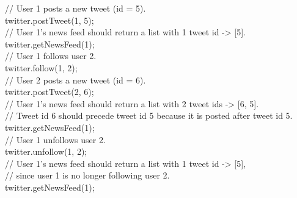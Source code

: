 // User 1 posts a new tweet (id = 5).\\
twitter.postTweet(1, 5);\\

// User 1's news feed should return a list with 1 tweet id -> [5].\\
twitter.getNewsFeed(1);\\

// User 1 follows user 2.\\
twitter.follow(1, 2);\\

// User 2 posts a new tweet (id = 6).\\
twitter.postTweet(2, 6);\\

// User 1's news feed should return a list with 2 tweet ids -> [6, 5].\\
// Tweet id 6 should precede tweet id 5 because it is posted after tweet id 5.\\
twitter.getNewsFeed(1);\\

// User 1 unfollows user 2.\\
twitter.unfollow(1, 2);\\

// User 1's news feed should return a list with 1 tweet id -> [5],\\
// since user 1 is no longer following user 2.\\
twitter.getNewsFeed(1);\\

